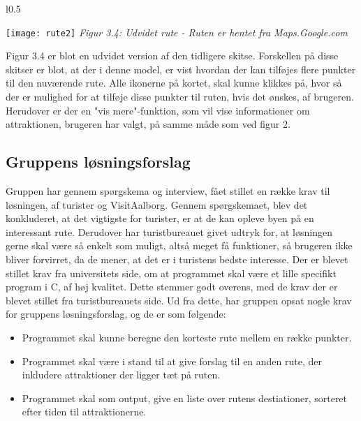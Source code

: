 \begin{wrapfigure}{l}{0.5\textwidth}
  \vspace{-20pt}
  \begin{center}
    \texttt{[image: rute2]} \newline
    \textit{Figur 3.4: Udvidet rute - Ruten er hentet fra Maps.Google.com}\newline
  \end{center}
  \vspace{-20pt}
  \vspace{-10pt}
\end{wrapfigure}

Figur 3.4 er blot en udvidet version af den tidligere skitse. Forskellen på disse skitser er blot, at der i denne model, er vist hvordan der kan tilføjes flere punkter til den nuværende rute. Alle ikonerne på kortet, skal kunne klikkes på, hvor så der er mulighed for at tilføje disse punkter til ruten, hvis det ønskes, af brugeren. Herudover er der en "vis mere"-funktion, som vil vise informationer om attraktionen, brugeren har valgt, på samme måde som ved figur 2. \newline
\newline
\newline
\newline
\newline 

\subsection{Gruppens løsningsforslag}
Gruppen har gennem spørgskema og interview, fået stillet en række krav til løsningen, af turister og VisitAalborg. 
Gennem spørgskemaet, blev det konkluderet, at det vigtigste for turister, er at de kan opleve byen på en interessant rute. 
Derudover har turistbureauet givet udtryk for, at løsningen gerne skal være så enkelt som muligt, altså meget få funktioner, så brugeren ikke bliver forvirret, da de mener, at det er i turistens bedste interesse. \newline
Der er blevet stillet krav fra universitets side, om at programmet skal være et lille specifikt program i C, af høj kvalitet. Dette stemmer godt overens, med de krav der er blevet stillet fra turistbureauets side.   \newline
Ud fra dette, har gruppen opsat nogle krav for gruppens løsningsforslag, og de er som følgende:
\begin{itemize}
	\item Programmet skal kunne beregne den korteste rute mellem en række punkter.
	\item Programmet skal være i stand til at give forslag til en anden rute, der inkludere attraktioner der ligger tæt på ruten.
 	\item Programmet skal som output, give en liste over rutens destiationer, sorteret efter tiden til attraktionerne.
\end{itemize}


